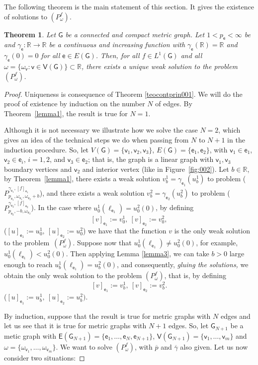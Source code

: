 \documentclass[reqno,12pt]{amsart}
\newtheorem{theorem}{Theorem}[section]
\def\R{\mathbb R} %
\def\e{\mathsf{e}} 	%
\def\v{\mathsf{v}}	%
\newcommand{\G}{\mathsf{G}}	%
\newcommand{\V}{\mathsf{V}}	%
\newcommand{\E}{\mathsf{E}}	%
\numberwithin{equation}{section} %
\begin{document}
The following theorem is the main statement of this section. It gives the existence of solutions to $(P_{\omega}^f)$.

\begin{theorem}\label{ExitUniq1}  Let  $\G$ be a   connected and compact metric graph.
  Let $1 < p_\e < \infty$ be and   $\gamma_\e:\R\to \R$ be a continuous and increasing function with $\gamma_\e(\mathbb{R})=\mathbb{R}$ and $\gamma_\e(0)=0$ for all $\e \in E(\G)$.  Then, for all   $f \in L^{1}(\G)$  and all $\omega=\{ \omega_\v: \v \in \V(\G) \} \subset \R$,   there exists a unique weak solution to the problem $(P_{\omega}^f)$.
\end{theorem}
 
\begin{proof} Uniqueness  is consequence of Theorem \ref{teocontprin001}. We will do the proof   of   existence  by induction on the number $N$ of edges. By Theorem~\ref{lemma1}, the result is true for $N=1$.  

Although it is not necessary we illustrate how we solve the case $N=2$, which gives an idea of the technical steps we do when passing from $N$ to $N+1$ in the induction procedure.   So, let $V(\G) = \{\v_1, \v_2, \v_3 \}$, $E(\G) = \{\e_1, \e_2 \}$, with $\v_1\in \e_1$, $\v_2\in \e_i$, $i=1,2$, and $\v_3\in \e_2$; that is, the graph is a linear graph with $\v_1,\v_3$ boundary vertices and $\v_2$ and interior vertex  (like in Figure~\ref{fig:002}). Let $b\in \mathbb{R}$, by Theorem~\ref{lemma1}, there exists a weak solution $ v^1_b=\gamma_{\e_1}(u^1_b)$ to problem ($P_{p_{\e_1},\omega_{\v_1},\omega_{\v_2}+b}^{\gamma_{{\e_1}},[f]_{\e_1}}$), and there exists  a weak solution $ v^2_b=\gamma_{\e_2}(u^2_b)$ to problem ($P_{p_{\e_2},-b,\omega_{\v_3}}^{\gamma_{{\e_2}},[f]_{\e_2}}$). In the case where $u^1_0(\ell_{\e_1}) = u^2_0(0)$,   by defining
$$  [v]_{\e_1}:= v^1_0,   \ [v]_{\e_2}:= v^2_0,$$
($[u]_{\e_1}:= u^1_0,   \ [u]_{\e_2}:= u^2_0$) we have that the function $v$ 
is the only weak solution to the problem~$(P_\omega^{f})$. Suppose now that $u^1_0(\ell_{\e_1}) \not= u^2_0(0)$, for example, $u^1_0(\ell_{\e_1}) < u^2_0(0)$. Then applying Lemma \ref{lemma3}, we can take $b>0$ large enough to reach $u^1_b(\ell_{\e_1}) = u^2_b(0)$, and consequently, {\it gluing the solutions,} we obtain   the only  weak solution to the problem  $(P_{\omega}^f)$, that is,   by defining  
$$   [v]_{\e_1}:= v^1_b,  \ [v]_{\e_2}:= v^2_b.$$
($[u]_{\e_1}:= u^1_b, \ [u]_{\e_2}:= u^2_b).$

By induction, suppose that the result is true for metric graphs with $N$ edges and let us see that it is true for metric graphs with $N+1$ edges.
So, let $\G_{N+1}$ be a metic graph with $\E(\G_{N+1}) = \{ \e_1, \ldots, \e_N, \e_{N+1} \}$, $\V(\G_ {N+1}) = \{ \v_1, \ldots, \v_m \}$ and $\omega = \{\omega_{\v_1}, \ldots, \omega_{\v_m} \}$. We want to solve $(P_\omega^f)$, with  $\overline{p}$ and $\overline{\gamma}$ also given. Let us now consider two situations:


\end{proof}
\end{document}
